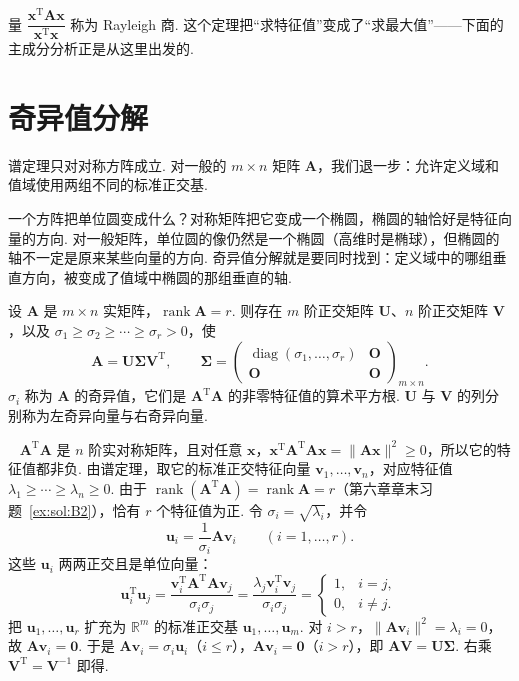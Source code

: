 \documentclass[lang=cn,10.5pt,scheme=chinese,toc=twocol,section,chinesefont=nofont,
twoside,citestyle=gb7714-2015,bibstyle=gb7714-2015]{elegantbook}
\DeclareRobustCommand{\textbf}[1]{{\lnsemiboldlatin\lnsemiboldcjk #1}}
\newcommand{\vv}[1]{\boldsymbol{#1}}
\newcommand{\zero}{\boldsymbol{0}}          %
\newcommand{\trans}{\mathrm{T}}             %
\numberwithin{equation}{section}   %
\newcommand{\rk}{\operatorname{rank}}       %
\newcommand{\diag}{\operatorname{diag}}
\newcommand{\hB}{\texorpdfstring{\textdagger}{†}}
\newcommand*{\lnlabel}[1]{{\sffamily\bfseries\color{black}#1}}
\renewenvironment{proof}{%
	\par\noindent\lnlabel{\proofname}\;\ \color{black!90}\cfs}{\par}
\begin{document}
量 $\dfrac{\vv x^\trans\vv{Ax}}{\vv x^\trans\vv x}$ 称为 \textbf{Rayleigh 商}. 这个定理把“求特征值”变成了“求最大值”——下面的主成分分析正是从这里出发的.

\section{\hB 奇异值分解}

谱定理只对对称方阵成立. 对一般的 $m\times n$ 矩阵 $\vv A$，我们退一步：允许定义域和值域使用\textbf{两组不同的}标准正交基.

\begin{motivebox}
  一个方阵把单位圆变成什么？对称矩阵把它变成一个椭圆，椭圆的轴恰好是特征向量的方向. 对一般矩阵，单位圆的像仍然是一个椭圆（高维时是椭球），但椭圆的轴\textbf{不一定}是原来某些向量的方向. 奇异值分解就是要同时找到：定义域中的哪组垂直方向，被变成了值域中椭圆的那组垂直的轴.
\end{motivebox}

\begin{theorem}[奇异值分解]\label{thm:svd}
  设 $\vv A$ 是 $m\times n$ 实矩阵，$\rk\vv A=r$. 则存在 $m$ 阶正交矩阵 $\vv U$、$n$ 阶正交矩阵 $\vv V$，以及 $\sigma_1\ge\sigma_2\ge\cdots\ge\sigma_r>0$，使
  \[\vv A=\vv U\vv\Sigma\vv V^\trans,\qquad \vv\Sigma=
    \begin{pmatrix}
      \diag(\sigma_1,\ldots,\sigma_r) & \vv O \\ \vv O&\vv O
    \end{pmatrix}
    _{m\times n}.\]
  $\sigma_i$ 称为 $\vv A$ 的\textbf{奇异值}，它们是 $\vv A^\trans\vv A$ 的非零特征值的算术平方根. $\vv U$ 与 $\vv V$ 的列分别称为\textbf{左奇异向量}与\textbf{右奇异向量}.
\end{theorem}
\begin{proof}
  $\vv A^\trans\vv A$ 是 $n$ 阶实对称矩阵，且对任意 $\vv x$，$\vv x^\trans\vv A^\trans\vv A\vv x=\|\vv{Ax}\|^2\ge0$，所以它的特征值都非负. 由谱定理，取它的标准正交特征向量 $\vv v_1,\ldots,\vv v_n$，对应特征值 $\lambda_1\ge\cdots\ge\lambda_n\ge0$. 由于 $\rk(\vv A^\trans\vv A)=\rk\vv A=r$（第六章章末习题~\ref{ex:sol:B2}），恰有 $r$ 个特征值为正. 令 $\sigma_i=\sqrt{\lambda_i}$，并令
  \[\vv u_i=\frac1{\sigma_i}\vv A\vv v_i\qquad(i=1,\ldots,r).\]
  这些 $\vv u_i$ 两两正交且是单位向量：
  \[\vv u_i^\trans\vv u_j=\frac{\vv v_i^\trans\vv A^\trans\vv A\vv v_j}{\sigma_i\sigma_j}=\frac{\lambda_j\vv v_i^\trans\vv v_j}{\sigma_i\sigma_j}=
    \begin{cases}
      1, & i=j, \\0,&i\ne j.
    \end{cases}
  \]
  把 $\vv u_1,\ldots,\vv u_r$ 扩充为 $\mathbb{R}^m$ 的标准正交基 $\vv u_1,\ldots,\vv u_m$. 对 $i>r$，$\|\vv A\vv v_i\|^2=\lambda_i=0$，故 $\vv A\vv v_i=\zero$. 于是 $\vv A\vv v_i=\sigma_i\vv u_i$（$i\le r$），$\vv A\vv v_i=\zero$（$i>r$），即 $\vv{AV}=\vv U\vv\Sigma$. 右乘 $\vv V^\trans=\vv V^{-1}$ 即得.
\end{proof}
\end{document}
